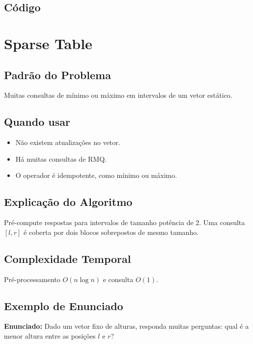 \subsection{Código}

\section{Sparse Table}

\subsection{Padrão do Problema}
Muitas consultas de mínimo ou máximo em intervalos de um vetor estático.

\subsection{Quando usar}
\begin{itemize}[nosep]
  \item Não existem atualizações no vetor.
  \item Há muitas consultas de RMQ.
  \item O operador é idempotente, como mínimo ou máximo.
\end{itemize}

\subsection{Explicação do Algoritmo}
Pré-compute respostas para intervalos de tamanho potência de 2. Uma consulta $[l,r]$ é coberta por dois blocos sobrepostos de mesmo tamanho.

\subsection{Complexidade Temporal}
Pré-processamento $O(n \log n)$ e consulta $O(1)$.

\subsection{Exemplo de Enunciado}
\begin{exemplodiabox}
\textbf{Enunciado:} Dado um vetor fixo de alturas, responda muitas perguntas: qual é a menor altura entre as posições $l$ e $r$?
\end{exemplodiabox}

